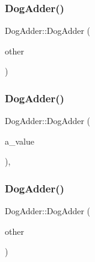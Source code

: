 \mbox{\label{class_dog_adder_a35bb24b649b63f38784dcb44d55c4d94}} 
\subsubsection{\texorpdfstring{DogAdder()}{DogAdder()}\hspace{0.1cm}{\footnotesize\ttfamily [2/6]}}
{\footnotesize\ttfamily Dog\+Adder\+::\+Dog\+Adder (\begin{DoxyParamCaption}\item[{const \mbox{\hyperlink{class_dog_adder}{Dog\+Adder}} \&}]{other }\end{DoxyParamCaption})\hspace{0.3cm}{\ttfamily [inline]}}

\mbox{\label{class_dog_adder_a7fd76a2078834dc255c7dd7ac7c58f32}} 
\subsubsection{\texorpdfstring{DogAdder()}{DogAdder()}\hspace{0.1cm}{\footnotesize\ttfamily [3/6]}}
{\footnotesize\ttfamily Dog\+Adder\+::\+Dog\+Adder (\begin{DoxyParamCaption}\item[{const char $\ast$}]{a\+\_\+value }\end{DoxyParamCaption})\hspace{0.3cm}{\ttfamily [inline]}, {\ttfamily [explicit]}}

\mbox{\label{class_dog_adder_a35bb24b649b63f38784dcb44d55c4d94}} 
\subsubsection{\texorpdfstring{DogAdder()}{DogAdder()}\hspace{0.1cm}{\footnotesize\ttfamily [4/6]}}
{\footnotesize\ttfamily Dog\+Adder\+::\+Dog\+Adder (\begin{DoxyParamCaption}\item[{const \mbox{\hyperlink{class_dog_adder}{Dog\+Adder}} \&}]{other }\end{DoxyParamCaption})\hspace{0.3cm}{\ttfamily [inline]}}

